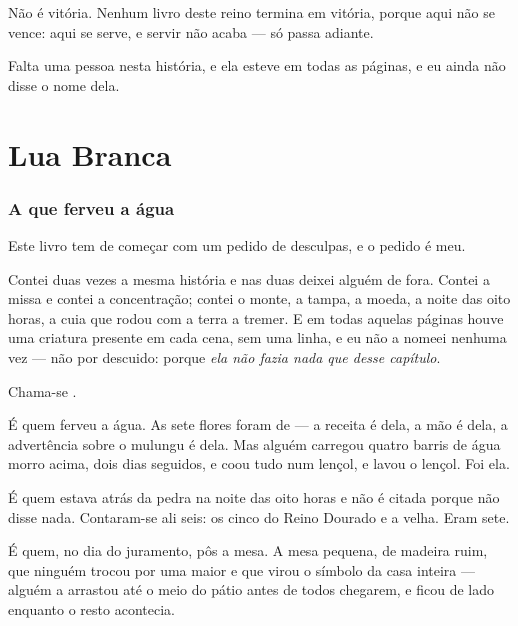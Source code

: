 \documentclass[livro.tex]{subfiles}
\begin{document}
Não é vitória. Nenhum livro deste reino termina em vitória, porque aqui não se vence: aqui se
serve, e servir não acaba --- só passa adiante.

\medskip

Falta uma pessoa nesta história, e ela esteve em todas as páginas, e eu ainda não disse o nome
dela.


\part{Lua Branca}

\section{A que ferveu a água}

Este livro tem de começar com um pedido de desculpas, e o pedido é meu.

Contei duas vezes a mesma história e nas duas deixei alguém de fora. Contei a missa e contei a
concentração; contei o monte, a tampa, a moeda, a noite das oito horas, a cuia que rodou com a
terra a tremer. E em todas aquelas páginas houve uma criatura presente em cada cena, sem uma
linha, e eu não a nomeei nenhuma vez --- não por descuido: porque \emph{ela não fazia nada que
desse capítulo}.

Chama-se \Lua .

\medskip

É quem ferveu a água. As sete flores foram de \Qui --- a receita é dela, a mão é dela, a
advertência sobre o mulungu é dela. Mas alguém carregou quatro barris de água morro acima, dois
dias seguidos, e coou tudo num lençol, e lavou o lençol. Foi ela.

É quem estava atrás da pedra na noite das oito horas e não é citada porque não disse nada.
Contaram-se ali seis: os cinco do Reino Dourado e a velha. Eram sete.

É quem, no dia do juramento, pôs a mesa. A mesa pequena, de madeira ruim, que ninguém trocou por
uma maior e que virou o símbolo da casa inteira --- alguém a arrastou até o meio do pátio antes
de todos chegarem, e ficou de lado enquanto o resto acontecia.
\end{document}
